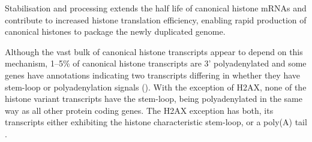  \begin{figure*}
    \centering
    \hfill
  \end{figure*}

  Stabilisation and processing extends the half life of canonical histone mRNAs
  and contribute to increased histone translation efficiency,
  enabling rapid production of canonical histones to package the newly duplicated genome.

  Although the vast bulk of canonical histone transcripts appear to depend on this mechanism,
  1--5\% of canonical histone transcripts are 3' polyadenylated \citep{YangGenomeBiol2011}
  and some genes have annotations indicating two transcripts
  differing in whether they have stem-loop or polyadenylation signals ().
  With the exception of H2AX, none of the histone variant transcripts have the
  stem-loop, being polyadenylated in the same way as all other protein coding genes.
  The H2AX exception has both, its transcripts either exhibiting the histone
  characteristic stem-loop, or a poly(A) tail \citep{HTwoAX-transcripts,our-H2AX-review}.
